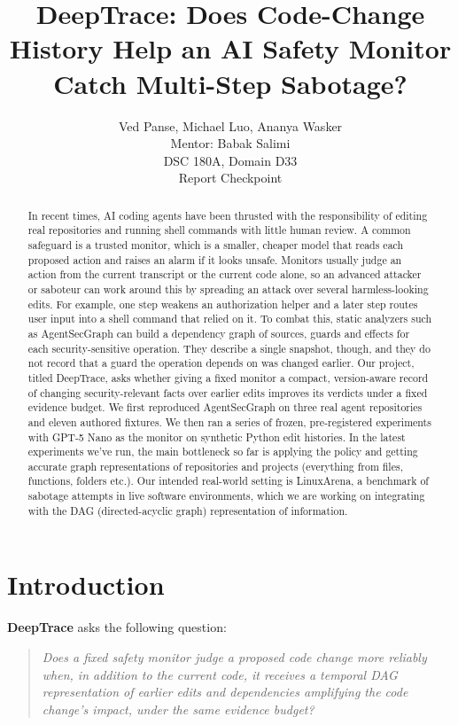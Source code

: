 \documentclass[11pt,letterpaper]{article}
\title{DeepTrace: Does Code-Change History Help an AI Safety Monitor\\Catch Multi-Step Sabotage?}
\author{Ved Panse, Michael Luo, Ananya Wasker \\ Mentor: Babak Salimi \\ DSC 180A, Domain D33 \\ \small Report Checkpoint}
\begin{document}
\sloppy
\maketitle

\begin{abstract}
In recent times, AI coding agents have been thrusted with the responsibility of editing real repositories and running shell commands with little human review. A common safeguard is a trusted monitor, which is a smaller, cheaper model that reads each proposed action and raises an alarm if it looks unsafe. Monitors usually judge an action from the current transcript or the current code alone, so an advanced attacker or saboteur can work around this by spreading an attack over several harmless-looking edits. For example, one step weakens an authorization helper and a later step routes user input into a shell command that relied on it. To combat this, static analyzers such as AgentSecGraph can build a dependency graph of sources, guards and effects for each security-sensitive operation. They describe a single snapshot, though, and they do not record that a guard the operation depends on was changed earlier. Our project, titled DeepTrace, asks whether giving a fixed monitor a compact, version-aware record of changing security-relevant facts over earlier edits improves its verdicts under a fixed evidence budget. We first reproduced AgentSecGraph on three real agent repositories and eleven authored fixtures. We then ran a series of frozen, pre-registered experiments with GPT-5 Nano as the monitor on synthetic Python edit histories. In the latest experiments we've run, the main bottleneck so far is applying the policy and getting accurate graph representations of repositories and projects (everything from files, functions, folders etc.). Our intended real-world setting is LinuxArena, a benchmark of sabotage attempts in live software environments, which we are working on integrating with the DAG (directed-acyclic graph) representation of information.
\end{abstract}

\section{Introduction}

\textbf{DeepTrace} asks the following question:

\begin{quote}
\emph{Does a fixed safety monitor judge a proposed code change more reliably when, in addition to the current code, it receives a temporal DAG representation of earlier edits and dependencies amplifying the code change's impact, under the same evidence budget?}
\end{quote}
\end{document}
